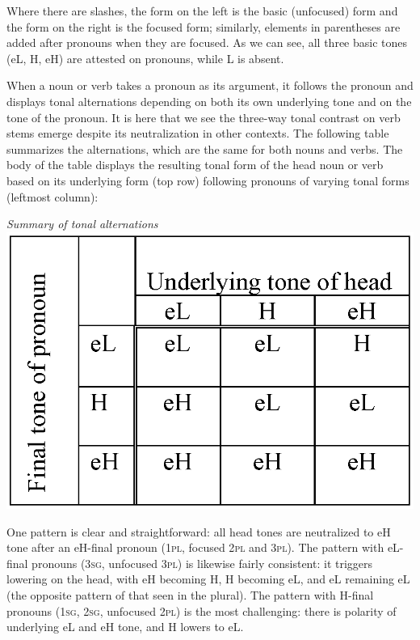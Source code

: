 \documentclass[output=paper]{langsci/langscibook}
\begin{document}
Where there are slashes, the form on the left is the basic (unfocused) form and the form on the right is the focused form; similarly, elements in parentheses are added after pronouns when they are focused. As we can see, all three basic tones (eL, H, eH) are attested on pronouns, while L is absent.

When a noun or verb takes a pronoun as its argument, it follows the pronoun and displays tonal alternations depending on both its own underlying tone and on the tone of the pronoun. It is here that we see the three-way tonal contrast on verb stems emerge despite its neutralization in other contexts. The following table summarizes the alternations, which are the same for both nouns and verbs. The body of the table displays the resulting tonal form of the head noun or verb based on its underlying form (top row) following pronouns of varying tonal forms (leftmost column):

\ea\label{ex:mcpherson:TabSummaryofAlternations} {\it Summary of tonal alternations} \\
\includegraphics[scale=.55]{figures/Alternations.eps} 
\z

One pattern is clear and straightforward: all head tones are neutralized to eH tone after an eH-final pronoun (1\textsc{pl}, focused 2\textsc{pl} and 3\textsc{pl}). The pattern with eL-final pronouns (3\textsc{sg}, unfocused 3\textsc{pl}) is likewise fairly consistent: it triggers lowering on the head, with eH becoming H, H becoming eL, and eL remaining eL (the opposite pattern of that seen in the plural). The pattern with H-final pronouns (1\textsc{sg}, 2\textsc{sg}, unfocused 2\textsc{pl}) is the most challenging: there is polarity of underlying eL and eH tone, and H lowers to eL. 
\end{document}

